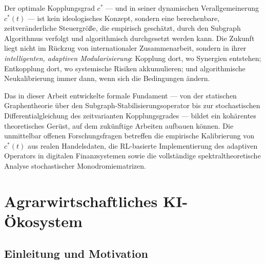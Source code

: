\documentclass[a4paper, 12pt, twoside, openright]{report}
\theoremstyle{definition}
\theoremstyle{definition}
\begin{document}
Der optimale Kopplungsgrad $c^*$ --- und in seiner dynamischen Verallgemeinerung $c^*(t)$
--- ist kein ideologisches Konzept, sondern eine berechenbare, zeitveränderliche Steuergröße,
die empirisch geschätzt, durch den Subgraph Algorithmus verfolgt und algorithmisch
durchgesetzt werden kann. Die Zukunft liegt nicht im Rückzug von internationaler
Zusammenarbeit, sondern in ihrer \emph{intelligenten, adaptiven Modularisierung}:
Kopplung dort, wo Synergien entstehen; Entkopplung dort, wo systemische Risiken akkumulieren;
und algorithmische Neukalibrierung immer dann, wenn sich die Bedingungen ändern.

Das in dieser Arbeit entwickelte formale Fundament --- von der statischen Graphentheorie
über den Subgraph-Stabilisierungsoperator bis zur stochastischen Differentialgleichung
des zeitvarianten Kopplungsgrades --- bildet ein kohärentes theoretisches Gerüst, auf dem
zukünftige Arbeiten aufbauen können. Die unmittelbar offenen Forschungsfragen betreffen
die empirische Kalibrierung von $c^*(t)$ aus realen Handelsdaten, die RL-basierte
Implementierung des adaptiven Operators in digitalen Finanzsystemen sowie die
vollständige spektraltheoretische Analyse stochastischer Monodromiematrizen.

\cleardoublepage


\chapter{Agrarwirtschaftliches KI-Ökosystem}
\label{ch:agri-ai}

\section{Einleitung und Motivation}
\end{document}
